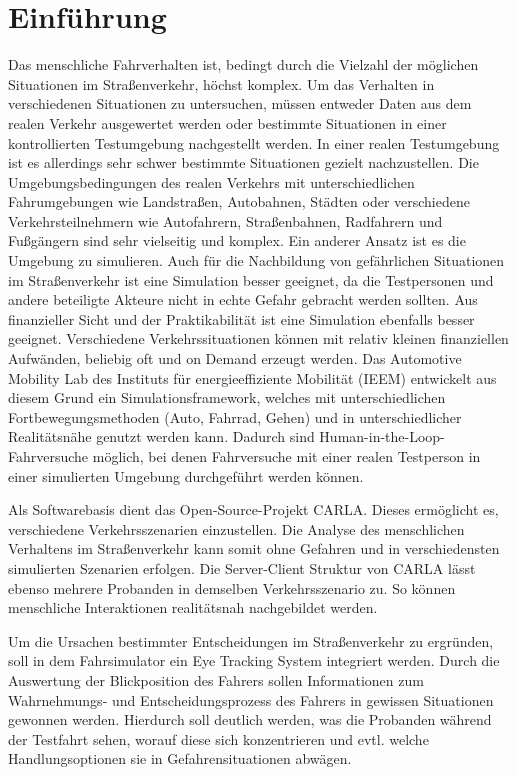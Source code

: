 \chapter{Einführung}
\label{sec:einführung}

Das menschliche Fahrverhalten ist, bedingt durch die Vielzahl der möglichen Situationen im Straßenverkehr, höchst komplex. Um das Verhalten in verschiedenen Situationen zu untersuchen, müssen entweder Daten aus dem realen Verkehr ausgewertet werden oder bestimmte Situationen in einer kontrollierten Testumgebung nachgestellt werden. In einer realen Testumgebung ist es allerdings sehr schwer bestimmte Situationen gezielt nachzustellen. Die Umgebungsbedingungen des realen Verkehrs mit unterschiedlichen Fahrumgebungen wie Landstraßen, Autobahnen, Städten oder verschiedene Verkehrsteilnehmern wie Autofahrern, Straßenbahnen, Radfahrern und Fußgängern sind sehr vielseitig und komplex. Ein anderer Ansatz ist es die Umgebung zu simulieren. Auch für die Nachbildung von gefährlichen Situationen im Straßenverkehr ist eine Simulation besser geeignet, da die Testpersonen und andere beteiligte Akteure nicht in echte Gefahr gebracht werden sollten. Aus finanzieller Sicht und der Praktikabilität ist eine Simulation ebenfalls besser geeignet. Verschiedene Verkehrssituationen können mit relativ kleinen finanziellen Aufwänden, beliebig oft und on Demand erzeugt werden. Das Automotive Mobility Lab des Instituts für energieeffiziente Mobilität (IEEM) entwickelt aus diesem Grund ein Simulationsframework, welches mit unterschiedlichen Fortbewegungsmethoden (Auto, Fahrrad, Gehen) und in unterschiedlicher Realitätsnähe genutzt werden kann. Dadurch sind Human-in-the-Loop-Fahrversuche möglich, bei denen Fahrversuche mit einer realen Testperson in einer simulierten Umgebung durchgeführt werden können.  

Als Softwarebasis dient das Open-Source-Projekt CARLA. Dieses ermöglicht es, verschiedene Verkehrsszenarien einzustellen. Die Analyse des menschlichen Verhaltens im Straßenverkehr kann somit ohne Gefahren und in verschiedensten simulierten Szenarien erfolgen. Die Server-Client Struktur von CARLA lässt ebenso mehrere Probanden in demselben Verkehrsszenario zu. So können menschliche Interaktionen realitätsnah nachgebildet werden.

Um die Ursachen bestimmter Entscheidungen im Straßenverkehr zu ergründen, soll in dem Fahrsimulator ein Eye Tracking System integriert werden. Durch die Auswertung der Blickposition des Fahrers sollen Informationen zum Wahrnehmungs- und Entscheidungsprozess des Fahrers in gewissen Situationen gewonnen werden. Hierdurch soll deutlich werden, was die Probanden während der Testfahrt sehen, worauf diese sich konzentrieren und evtl. welche Handlungsoptionen sie in Gefahrensituationen abwägen.

